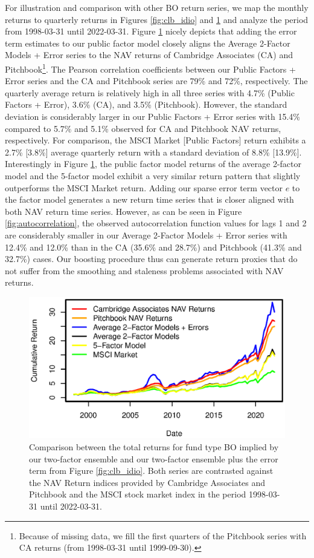 \documentclass[12pt]{article}
\begin{document}
For illustration and comparison with other BO return series, we map the monthly returns to quarterly returns in Figures \ref{fig:clb_idio} and \ref{fig:clb_total} and analyze the period from 1998-03-31 until 2022-03-31.
Figure \ref{fig:clb_total} nicely depicts that adding the error term estimates to our public factor model closely aligns the Average 2-Factor Models + Error series to the NAV returns of Cambridge Associates (CA) and Pitchbook\footnote{Because of missing data, we fill the first quarters of the Pitchbook series with CA returns (from 1998-03-31 until 1999-09-30).}.
The Pearson correlation coefficients between our Public Factors + Error series and the CA and Pitchbook series are 79\% and 72\%, respectively.
The quarterly average return is relatively high in all three series with 4.7\% (Public Factors + Error), 3.6\% (CA), and 3.5\% (Pitchbook).
However, the standard deviation is considerably larger in our Public Factors + Error series with 15.4\% compared to 5.7\% and 5.1\% observed for CA and Pitchbook NAV returns, respectively.
For comparison, the MSCI Market [Public Factors] return exhibits a 2.7\% [3.8\%] average quarterly return with a standard deviation of 8.8\% [13.9\%].
Interestingly in Figure \ref{fig:clb_total}, the public factor model returns of the average 2-factor model and the 5-factor model exhibit a very similar return pattern that slightly outperforms the MSCI Market return.
Adding our sparse error term vector $e$ to the factor model generates a new return time series that is closer aligned with both NAV return time series.
However, as can be seen in Figure \ref{fig:autocorrelation}, the observed autocorrelation function values for lags 1 and 2 are considerably smaller in our Average 2-Factor Models + Error series with 12.4\% and 12.0\% than in the CA (35.6\% and 28.7\%) and Pitchbook (41.3\% and 32.7\%) cases.
Our boosting procedure thus can generate return proxies that do not suffer from the smoothing and staleness problems associated with NAV returns.

\begin{figure}[H]
	\centering
	\includegraphics{Figures/XTotalErrorSeriesBO}
	\caption{
		Comparison between the total returns for fund type BO implied by our two-factor ensemble and our two-factor ensemble plus the error term from Figure \ref{fig:clb_idio}.
		Both series are contrasted against the NAV Return indices provided by Cambridge Associates and Pitchbook and the MSCI stock market index in the period 1998-03-31 until 2022-03-31.
		}
	\label{fig:clb_total}
\end{figure}
\end{document}
